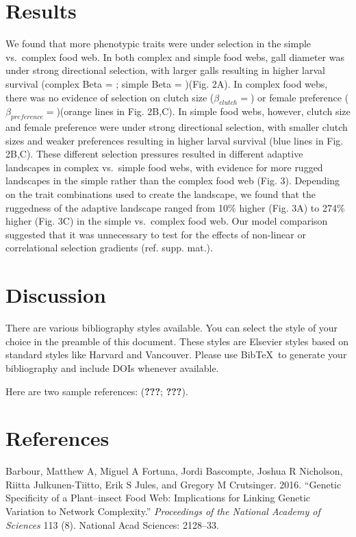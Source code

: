 \documentclass[]{elsarticle} %
\begin{document}
\section{Results}\label{results}

We found that more phenotypic traits were under selection in the simple
vs.~complex food web. In both complex and simple food webs, gall
diameter was under strong directional selection, with larger galls
resulting in higher larval survival (complex Beta = ; simple Beta =
)(Fig. 2A). In complex food webs, there was no evidence of selection on
clutch size (\(\beta_{clutch}=\)) or female preference
(\(\beta_{preference}=\))(orange lines in Fig. 2B,C). In simple food
webs, however, clutch size and female preference were under strong
directional selection, with smaller clutch sizes and weaker preferences
resulting in higher larval survival (blue lines in Fig. 2B,C). These
different selection pressures resulted in different adaptive landscapes
in complex vs.~simple food webs, with evidence for more rugged
landscapes in the simple rather than the complex food web (Fig. 3).
Depending on the trait combinations used to create the landscape, we
found that the ruggedness of the adaptive landscape ranged from 10\%
higher (Fig. 3A) to 274\% higher (Fig. 3C) in the simple vs.~complex
food web. Our model comparison suggested that it was unnecessary to test
for the effects of non-linear or correlational selection gradients (ref.
supp. mat.).

\section{Discussion}\label{discussion}

There are various bibliography styles available. You can select the
style of your choice in the preamble of this document. These styles are
Elsevier styles based on standard styles like Harvard and Vancouver.
Please use BibTeX~to generate your bibliography and include DOIs
whenever available.

Here are two sample references: ({\textbf{???}}; {\textbf{???}}).

\section*{References}\label{references}

\hypertarget{refs}{}
\hypertarget{ref-Barbour2016}{}
Barbour, Matthew A, Miguel A Fortuna, Jordi Bascompte, Joshua R
Nicholson, Riitta Julkunen-Tiitto, Erik S Jules, and Gregory M
Crutsinger. 2016. ``Genetic Specificity of a Plant--insect Food Web:
Implications for Linking Genetic Variation to Network Complexity.''
\emph{Proceedings of the National Academy of Sciences} 113 (8). National
Acad Sciences: 2128--33.
\end{document}
